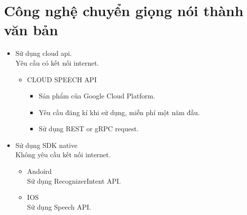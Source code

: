 \documentclass[a4paper,12pt,oneside]{article}
\begin{document}
\section{Công nghệ chuyển giọng nói thành văn bản }
	\begin{itemize}
			\item Sử dụng cloud api.\\
			Yêu cầu có kết nối internet.
			\begin{itemize}
				\item CLOUD SPEECH API 
					\begin{itemize}
						\item Sản phẩm của Google Cloud Platform.
						\item Yêu cầu đăng kí khi sử dụng, miễn phí một năm đầu.
						\item Sử dụng REST or gRPC request.
					\end{itemize}
			\end{itemize}
			\item Sử dụng SDK native\\
			Không yêu cầu kết nối internet.
				\begin{itemize}
					\item Andoird \\
					Sử dụng RecognizerIntent API.
					\item IOS \\	
					Sử dụng Speech API.			
				\end{itemize}
	\end{itemize}
\end{document}
